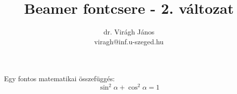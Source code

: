 \documentclass[12pt, xcolor=dvipsnames,svgnames,x11names]{beamer}
\author[Virágh János]{dr. Virágh János \\ viragh@inf.u-szeged.hu}
\title{Beamer fontcsere - 2. változat}
\institute[SZTE]{SZTE-TTIK Számítógépes Optimalizálás Tanszék}
\begin{document}
\begin{frame}[plain]
 \titlepage
\end{frame}
\begin{frame}
\hulipsum[1]
\end{frame}
\begin{frame}
Egy fontos matematikai összefüggés:
\[
\sin^2 \alpha + \cos^2 \alpha = 1
\]
\end{frame}
\end{document}
